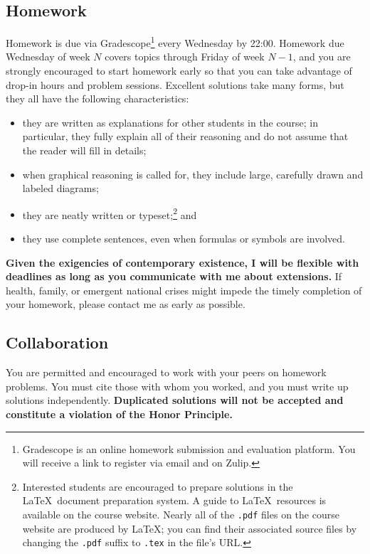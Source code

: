 \documentclass[11pt,twoside]{amsart}
\begin{document}
\subsection*{Homework}
Homework is due via Gradescope\footnote{Gradescope is an online homework submission and evaluation platform. You will receive a link to register via email and on Zulip.} every Wednesday by 22:00. Homework due Wednesday of week $N$ covers topics through Friday of week $N-1$, and you are strongly encouraged to start homework early so that you can take advantage of drop-in hours and problem sessions.  Excellent solutions take many forms, but they all have the following characteristics:

\begin{itemize}
\item they are written as explanations for other students in the course; in particular, they fully explain all of their reasoning and do not assume that the reader will fill in details;
\item when graphical reasoning is called for, they include large, carefully drawn and labeled diagrams;
\item they are neatly written or typeset;\footnote{Interested students are 
encouraged to prepare solutions in the \LaTeX~document preparation 
system.  A guide to \LaTeX~resources is available on the course 
website.  Nearly all of the \texttt{.pdf} files on the course website are produced by \LaTeX; you can find their associated source files by changing the \texttt{.pdf} suffix to \texttt{.tex} in the file's URL.} and
\item they use complete sentences, even when formulas or symbols are involved.
\end{itemize}

\textbf{Given the exigencies of contemporary existence, I will be flexible with deadlines as long as you communicate with me about extensions.} If health, family, or emergent national crises might impede the timely completion of your homework, please contact me as early as possible.

\subsection*{Collaboration}
You are permitted and encouraged to work with your peers on homework problems.  You must cite those with whom you worked, and you must write up solutions independently.  \textbf{Duplicated solutions will not be accepted and constitute a violation of the Honor Principle.}
\end{document}
